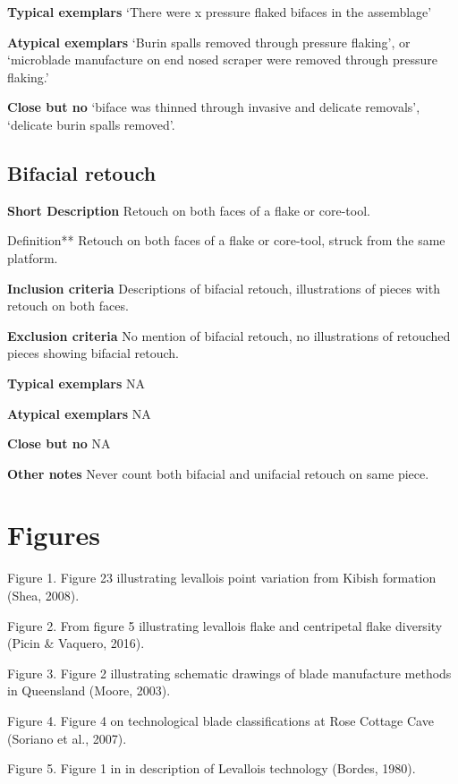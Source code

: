 \documentclass[
]{article}
\begin{document}
\textbf{Typical exemplars} `There were x pressure flaked bifaces in the
assemblage'

\textbf{Atypical exemplars} `Burin spalls removed through pressure
flaking', or `microblade manufacture on end nosed scraper were removed
through pressure flaking.'

\textbf{Close but no} `biface was thinned through invasive and delicate
removals', `delicate burin spalls removed'.

\hypertarget{bifacial-retouch}{%
\subsection{Bifacial retouch}\label{bifacial-retouch}}

\textbf{Short Description} Retouch on both faces of a flake or
core-tool.

Definition** Retouch on both faces of a flake or core-tool, struck from
the same platform.

\textbf{Inclusion criteria} Descriptions of bifacial retouch,
illustrations of pieces with retouch on both faces.

\textbf{Exclusion criteria} No mention of bifacial retouch, no
illustrations of retouched pieces showing bifacial retouch.

\textbf{Typical exemplars} NA

\textbf{Atypical exemplars} NA

\textbf{Close but no} NA

\textbf{Other notes} Never count both bifacial and unifacial retouch on
same piece.

\hypertarget{figures}{%
\section{Figures}\label{figures}}

Figure 1. Figure 23 illustrating levallois point variation from Kibish
formation (Shea, 2008).

Figure 2. From figure 5 illustrating levallois flake and centripetal
flake diversity (Picin \& Vaquero, 2016).

Figure 3. Figure 2 illustrating schematic drawings of blade manufacture
methods in Queensland (Moore, 2003).

Figure 4. Figure 4 on technological blade classifications at Rose
Cottage Cave (Soriano et al., 2007).

Figure 5. Figure 1 in in description of Levallois technology (Bordes,
1980).
\end{document}
